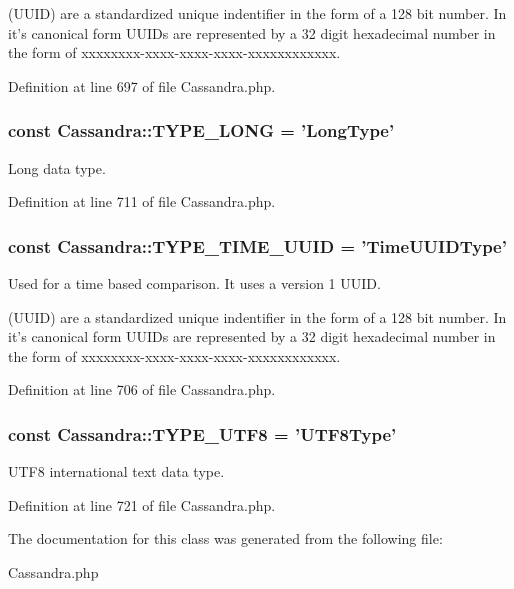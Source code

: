 (UUID) are a standardized unique indentifier in the form of a 128 bit number. In it's canonical form UUIDs are represented by a 32 digit hexadecimal number in the form of xxxxxxxx-\/xxxx-\/xxxx-\/xxxx-\/xxxxxxxxxxxx. 

Definition at line 697 of file Cassandra.php.

\hypertarget{classCassandra_acf64f8105c4bfe0c95f868437299442f}{
\subsubsection[{TYPE\_\-LONG}]{\setlength{\rightskip}{0pt plus 5cm}const {\bf Cassandra::TYPE\_\-LONG} = 'LongType'}}
\label{classCassandra_acf64f8105c4bfe0c95f868437299442f}
Long data type. 

Definition at line 711 of file Cassandra.php.

\hypertarget{classCassandra_a42861ad94788ba940228767a79f1c4c7}{
\subsubsection[{TYPE\_\-TIME\_\-UUID}]{\setlength{\rightskip}{0pt plus 5cm}const {\bf Cassandra::TYPE\_\-TIME\_\-UUID} = 'TimeUUIDType'}}
\label{classCassandra_a42861ad94788ba940228767a79f1c4c7}
Used for a time based comparison. It uses a version 1 UUID.

(UUID) are a standardized unique indentifier in the form of a 128 bit number. In it's canonical form UUIDs are represented by a 32 digit hexadecimal number in the form of xxxxxxxx-\/xxxx-\/xxxx-\/xxxx-\/xxxxxxxxxxxx. 

Definition at line 706 of file Cassandra.php.

\hypertarget{classCassandra_ac03a89bd430178d9bce987eba8001b82}{
\subsubsection[{TYPE\_\-UTF8}]{\setlength{\rightskip}{0pt plus 5cm}const {\bf Cassandra::TYPE\_\-UTF8} = 'UTF8Type'}}
\label{classCassandra_ac03a89bd430178d9bce987eba8001b82}
UTF8 international text data type. 

Definition at line 721 of file Cassandra.php.



The documentation for this class was generated from the following file:\begin{DoxyCompactItemize}
\item 
Cassandra.php\end{DoxyCompactItemize}
